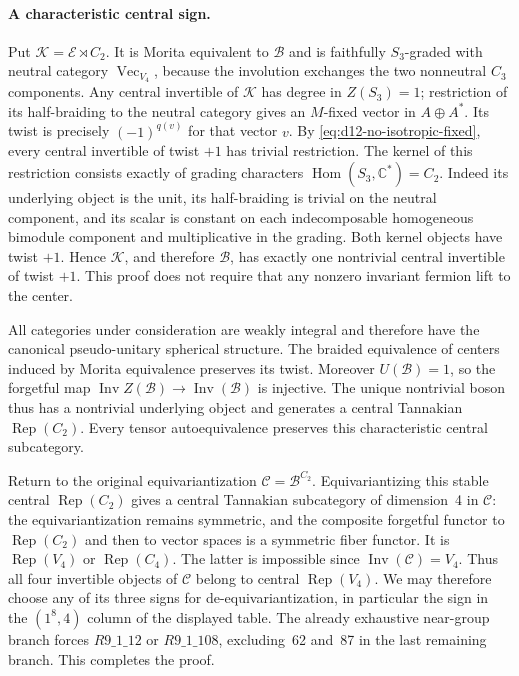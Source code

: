 \paragraph{A characteristic central sign.}
Put $\mathcal K=\mathcal E\rtimes C_2$. It is Morita equivalent to
$\mathcal B$ and is faithfully $S_3$-graded with neutral category
$\operatorname{Vec}_{V_4}$, because the involution exchanges the two
nonneutral $C_3$ components. Any central invertible of $\mathcal K$ has
degree in $Z(S_3)=1$; restriction of its half-braiding to the neutral
category gives an $M$-fixed vector in $A\oplus A^*$.
Its twist is precisely $(-1)^{q(v)}$ for that vector $v$. By
\eqref{eq:d12-no-isotropic-fixed}, every central invertible of twist $+1$
has trivial restriction. The kernel of this restriction consists exactly
of grading characters $\operatorname{Hom}(S_3,\mathbb C^*)=C_2$.
Indeed its underlying object is the unit, its half-braiding is trivial
on the neutral component, and its scalar is constant on each indecomposable
homogeneous bimodule component and multiplicative in the grading.
Both kernel objects have twist $+1$. Hence $\mathcal K$, and therefore
$\mathcal B$, has exactly one nontrivial central invertible of twist $+1$.
This proof does not require that any nonzero invariant fermion lift to the
center.

All categories under consideration are weakly integral and therefore have
the canonical pseudo-unitary spherical structure. The braided equivalence
of centers induced by Morita equivalence preserves its twist.
Moreover $U(\mathcal B)=1$, so the forgetful map
$\operatorname{Inv}Z(\mathcal B)\to\operatorname{Inv}(\mathcal B)$ is injective.
The unique nontrivial boson thus has a nontrivial underlying object and
generates a central Tannakian $\operatorname{Rep}(C_2)$.
Every tensor autoequivalence preserves this characteristic central
subcategory.

Return to the original equivariantization
$\mathcal C=\mathcal B^{C_2}$. Equivariantizing this stable central
$\operatorname{Rep}(C_2)$ gives a central Tannakian subcategory of dimension~4
in $\mathcal C$: the equivariantization remains symmetric, and the
composite forgetful functor to $\operatorname{Rep}(C_2)$ and then to
vector spaces is a symmetric fiber functor. It is $\operatorname{Rep}(V_4)$ or
$\operatorname{Rep}(C_4)$. The latter is impossible since
$\operatorname{Inv}(\mathcal C)=V_4$. Thus all four invertible objects of
$\mathcal C$ belong to central $\operatorname{Rep}(V_4)$.
We may therefore choose any of its three signs for de-equivariantization,
in particular the sign in the $(1^8,4)$ column of the displayed table.
The already exhaustive near-group branch forces $R9\_1\_12$ or
$R9\_1\_108$, excluding~62 and~87 in the last remaining branch. This
completes the proof.

